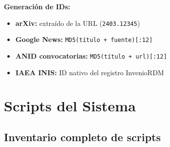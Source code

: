 \documentclass[12pt,a4paper]{report}
\begin{document}
\textbf{Generación de IDs:}
\begin{itemize}
  \item \textbf{arXiv:} extraído de la URL (\texttt{2403.12345})
  \item \textbf{Google News:} \texttt{MD5(título + fuente)[:12]}
  \item \textbf{ANID convocatorias:} \texttt{MD5(título + url)[:12]}
  \item \textbf{IAEA INIS:} ID nativo del registro InvenioRDM
\end{itemize}

\chapter{Scripts del Sistema}

\section{Inventario completo de scripts}
\end{document}
